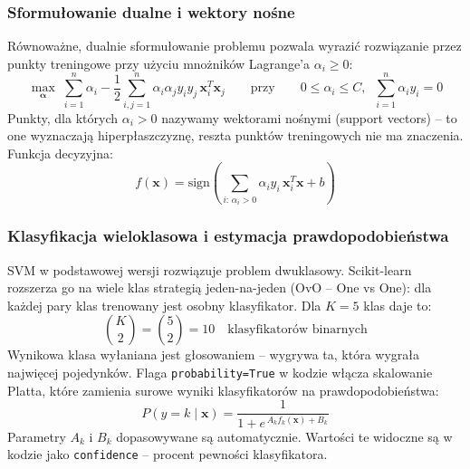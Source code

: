 \documentclass[12pt,oneside]{article}
\begin{document}
\subsubsection{Sformułowanie dualne i wektory nośne}
Równoważne, dualnie sformułowanie problemu pozwala wyrazić rozwiązanie przez punkty
treningowe przy użyciu mnożników Lagrange'a $\alpha_i \geq 0$:
\begin{equation}
    \max_{\boldsymbol{\alpha}}\;
    \sum_{i=1}^{n}\alpha_i - \frac{1}{2}\sum_{i,j=1}^{n}
    \alpha_i \alpha_j y_i y_j\, \mathbf{x}_i^T\mathbf{x}_j
    \qquad\text{przy}\qquad
    0 \leq \alpha_i \leq C,\;\; \sum_{i=1}^{n}\alpha_i y_i = 0
    \label{eq:svm_dual}
\end{equation}
Punkty, dla których $\alpha_i > 0$ nazywamy wektorami nośnymi (support vectors) --
to one wyznaczają hiperpłaszczyznę, reszta punktów treningowych nie ma znaczenia.
Funkcja decyzyjna:
\begin{equation}
    f(\mathbf{x}) = \text{sign}\!\left(
        \sum_{i:\,\alpha_i > 0} \alpha_i y_i\, \mathbf{x}_i^T\mathbf{x} + b
    \right)
    \label{eq:svm_decision}
\end{equation}

\subsubsection{Klasyfikacja wieloklasowa i estymacja prawdopodobieństwa}
SVM w podstawowej wersji rozwiązuje problem dwuklasowy. Scikit-learn rozszerza go
na wiele klas strategią jeden-na-jeden (OvO -- One vs One): dla każdej pary klas
trenowany jest osobny klasyfikator. Dla $K = 5$ klas daje to:
\begin{equation}
    \binom{K}{2} = \binom{5}{2} = 10 \quad\text{klasyfikatorów binarnych}
    \label{eq:ovo}
\end{equation}
Wynikowa klasa wyłaniana jest głosowaniem -- wygrywa ta, która wygrała najwięcej
pojedynków. Flaga \texttt{probability=True} w kodzie włącza skalowanie Platta,
które zamienia surowe wyniki klasyfikatorów na prawdopodobieństwa:
\begin{equation}
    P(y = k \mid \mathbf{x}) = \frac{1}{1 + e^{\,A_k f_k(\mathbf{x}) + B_k}}
    \label{eq:platt}
\end{equation}
Parametry $A_k$ i $B_k$ dopasowywane są automatycznie. Wartości te widoczne są
w kodzie jako \texttt{confidence} -- procent pewności klasyfikatora.
\end{document}
